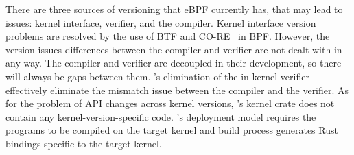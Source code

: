 \label{discussion:versions}
There are three sources of versioning that eBPF currently has, that may lead to issues: kernel interface, verifier, and the compiler.
Kernel interface version problems are resolved by the use of BTF and CO-RE~\cite{bpf-core} in BPF.
However, the version issues differences between the compiler and verifier are not dealt
    with in any way.
The compiler and verifier are decoupled in their development, so there will
    always be gaps between them.
\projname{}'s elimination of the in-kernel verifier effectively eliminate the
    mismatch issue between the compiler and the verifier.
As for the problem of API changes across kernel versions, \projname{}'s kernel
    crate does not contain any kernel-version-specific code.
\projname{}'s deployment model requires the programs to be compiled on the
    target kernel and build process generates Rust bindings specific to the
    target kernel.





